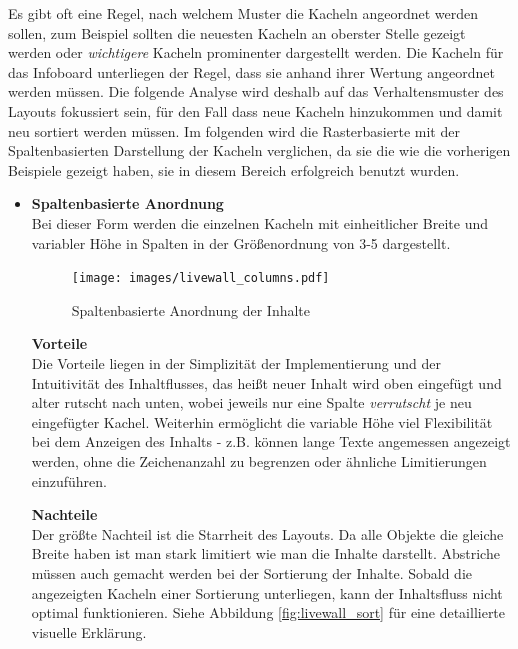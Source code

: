 \documentclass[12pt,twoside]{book}
\begin{document}
Es gibt oft eine Regel, nach welchem Muster die Kacheln angeordnet werden sollen, zum Beispiel sollten die neuesten Kacheln an oberster Stelle gezeigt werden oder \textit{wichtigere} Kacheln prominenter dargestellt werden. Die Kacheln für das Infoboard unterliegen der Regel, dass sie anhand ihrer Wertung angeordnet werden müssen. Die folgende Analyse wird deshalb auf das Verhaltensmuster des Layouts fokussiert sein, für den Fall dass neue Kacheln hinzukommen und damit neu sortiert werden müssen.
Im folgenden wird die Rasterbasierte mit der Spaltenbasierten Darstellung der Kacheln verglichen, da sie die wie die vorherigen Beispiele gezeigt haben, sie in diesem Bereich erfolgreich benutzt wurden.

\begin{itemize}
  \item \textbf{Spaltenbasierte Anordnung} \\
  Bei dieser Form werden die einzelnen Kacheln mit einheitlicher Breite und variabler Höhe in Spalten in der Größenordnung von 3-5 dargestellt.

  \begin{figure}[htbp]
    \centering
    \texttt{[image: images/livewall\_columns.pdf]}
    \caption{Spaltenbasierte Anordnung der Inhalte}
    \label{fig:awesome_image}
  \end{figure}

  \textbf{Vorteile} \\
  Die Vorteile liegen in der Simplizität der Implementierung und der Intuitivität des Inhaltflusses, das heißt neuer Inhalt wird oben eingefügt und alter rutscht nach unten, wobei jeweils nur eine Spalte \textit{verrutscht} je neu eingefügter Kachel.
  Weiterhin ermöglicht die variable Höhe viel Flexibilität bei dem Anzeigen des Inhalts - z.B. können lange Texte angemessen angezeigt werden, ohne die Zeichenanzahl zu begrenzen oder ähnliche Limitierungen einzuführen.

  \textbf{Nachteile}\\
  Der größte Nachteil ist die Starrheit des Layouts. Da alle Objekte die gleiche Breite haben ist man stark limitiert wie man die Inhalte darstellt. Abstriche müssen auch gemacht werden bei der Sortierung der Inhalte. Sobald die angezeigten Kacheln einer Sortierung unterliegen, kann der Inhaltsfluss nicht optimal funktionieren. Siehe Abbildung \ref{fig:livewall_sort} für eine detaillierte visuelle Erklärung.


\end{itemize}
\end{document}
